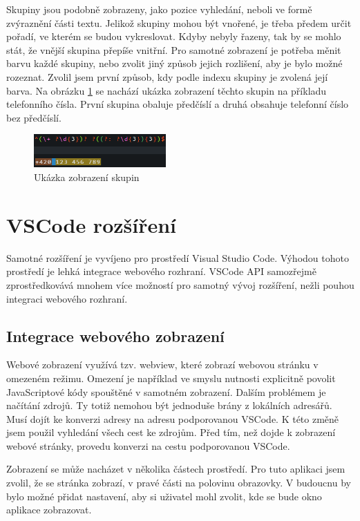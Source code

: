 Skupiny jsou podobně zobrazeny, jako pozice vyhledání, neboli ve formě zvýraznění části textu.
Jelikož skupiny mohou být vnořené, je třeba předem určit pořadí, ve kterém se budou vykreslovat.
Kdyby nebyly řazeny, tak by se mohlo stát, že vnější skupina přepíše vnitřní.
Pro samotné zobrazení je potřeba měnit barvu každé skupiny, nebo zvolit jiný způsob jejich rozlišení, aby je bylo možné rozeznat.
Zvolil jsem první způsob, kdy podle indexu skupiny je zvolená její barva.
Na obrázku \ref{fig:groupShowcase} se nachází ukázka zobrazení těchto skupin na příkladu telefonního čísla.
První skupina obaluje předčíslí a druhá obsahuje telefonní číslo bez předčíslí.

\begin{figure}[!h]
	\centering
	\includegraphics[width=0.45\textwidth]{Figures/groupShowcase.png}
	\caption{Ukázka zobrazení skupin}
	\label{fig:groupShowcase}
\end{figure} 

\section{VSCode rozšíření}

Samotné rozšíření je vyvíjeno pro prostředí Visual Studio Code.
Výhodou tohoto prostředí je lehká integrace webového rozhraní.
VSCode API samozřejmě zprostředkovává mnohem více možností pro samotný vývoj rozšíření, nežli pouhou integraci webového rozhraní.

\subsection*{Integrace webového zobrazení}

Webové zobrazení využívá tzv. webview, které zobrazí webovou stránku v omezeném režimu.
Omezení je například ve smyslu nutnosti explicitně povolit JavaScriptové kódy spouštěné v samotném zobrazení.
Dalším problémem je načítání zdrojů.
Ty totiž nemohou být jednoduše brány z lokálních adresářů. 
Musí dojít ke konverzi adresy na adresu podporovanou VSCode. 
K této změně jsem použil vyhledání všech cest ke zdrojům.
Před tím, než dojde k zobrazení webové stránky, provedu konverzi na cestu podporovanou VSCode.

Zobrazení se může nacházet v několika částech prostředí.
Pro tuto aplikaci jsem zvolil, že se stránka zobrazí, v pravé části na polovinu obrazovky.
V budoucnu by bylo možné přidat nastavení, aby si uživatel mohl zvolit, kde se bude okno aplikace zobrazovat.

